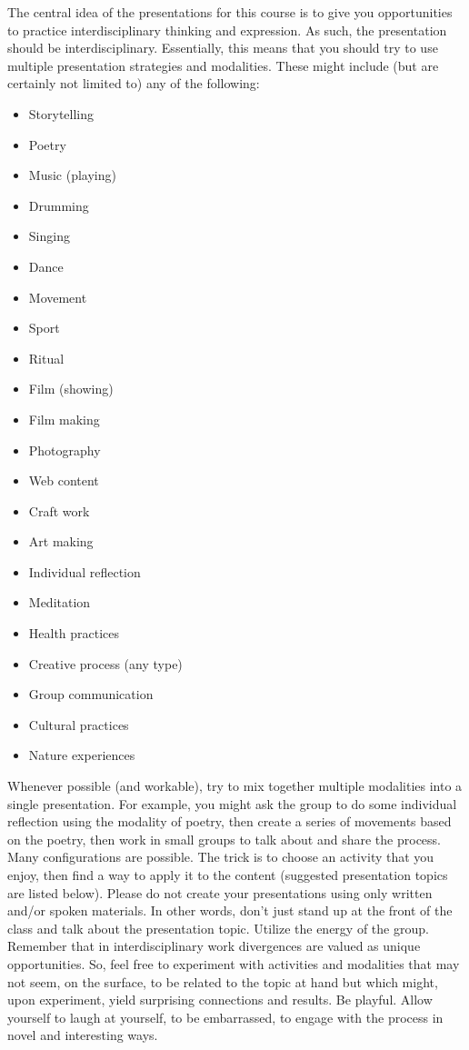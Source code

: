 \documentclass[letterpaper,10pt,headsepline]{scrreprt}
\begin{document}
The central idea of the presentations for this course is to give you opportunities to practice interdisciplinary thinking and expression.  As such, the presentation should be interdisciplinary. Essentially, this means that you should try to use multiple presentation strategies and modalities. These might include (but are certainly not limited to) any of the following:

 \begin{itemize}
 \item Storytelling
 \item Poetry
 \item Music (playing)
 \item Drumming
 \item Singing
 \item Dance
 \item Movement
 \item Sport
 \item Ritual
 \item Film (showing)
 \item Film making
 \item Photography
 \item Web content
 \item Craft work
 \item Art making
 \item Individual reflection
 \item Meditation
 \item Health practices
 \item Creative process (any type)
 \item Group communication
 \item Cultural practices
 \item Nature experiences
 \end{itemize}

 Whenever possible (and workable), try to mix together multiple modalities into a single presentation. For example, you might ask the group to do some individual reflection using the modality of poetry,
 then create a series of movements based on the poetry, then work in small groups to talk about and share the process. Many configurations are possible. The trick is to choose an activity that you enjoy, then find a way to apply it to the content (suggested presentation topics are listed below). Please do not create your presentations using only written and/or spoken materials. In other words, don't just stand up at the front of the class and talk about the presentation topic. Utilize the energy of the group. Remember that in interdisciplinary work divergences are valued as unique opportunities. So, feel free to experiment with activities and modalities that may not seem, on the surface, to be related to the topic at hand but which might, upon experiment, yield surprising connections and results. Be playful.
 Allow yourself to laugh at yourself, to be embarrassed, to engage with the process in novel and interesting ways.
\end{document}
